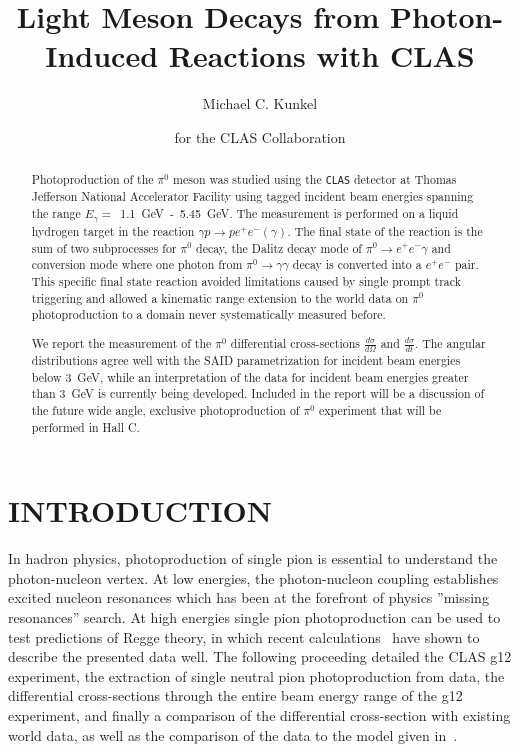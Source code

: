 \documentclass{aip-cp}
\begin{document}
\title{Light Meson Decays from Photon-Induced Reactions with CLAS}

\author[aff1]{Michael C. Kunkel}
\author[]{for the CLAS Collaboration }

\maketitle

\begin{abstract}
Photoproduction of the $\pi^0$ meson was studied using the \textsc{\texttt{CLAS}} detector at Thomas Jefferson National Accelerator Facility using tagged incident beam energies spanning the range $E_{\gamma}=$~1.1~GeV~-~5.45~GeV. The measurement is performed on a liquid hydrogen target in the reaction $\gamma p\to pe^+e^-(\gamma)$. The final state of the reaction is the sum of two subprocesses for $\pi^0$ decay, the Dalitz decay mode of $\pi^0\to e^+e^-\gamma$ and conversion mode where one photon from $\pi^0\to \gamma\gamma$ decay is converted into a $e^+e^-$ pair. This specific final state reaction avoided limitations caused by single prompt track triggering and allowed a kinematic range extension to the world data on $\pi^0$ photoproduction to a domain never systematically measured before.

We report the measurement of the $\pi^0$ differential cross-sections $\frac{d\sigma}{d\Omega}$ and $\frac{d\sigma}{dt}$. The angular distributions agree well with the SAID parametrization for incident beam energies below 3~GeV, while an interpretation of the data for incident beam energies greater than 3~GeV is currently being developed. Included in the report will be a discussion of the future wide angle, exclusive photoproduction of $\pi^0$ experiment that will be performed in Hall C.
\end{abstract}

\section{INTRODUCTION}
In hadron physics, photoproduction of single pion is essential to understand the photon-nucleon vertex. At low energies, the photon-nucleon coupling establishes excited nucleon resonances which has been at the forefront of physics ''missing resonances'' search. At high energies single pion photoproduction can be used to test predictions of Regge theory, in which recent calculations~\cite{bib0} have shown to describe the presented data well. The following proceeding detailed the CLAS g12 experiment, the extraction of single neutral pion photoproduction from data, the differential cross-sections through the entire beam energy range of the g12 experiment, and finally a comparison of the differential cross-section with existing world data, as well as the comparison of the data to the model given in~\cite{bib0}.
\end{document}
